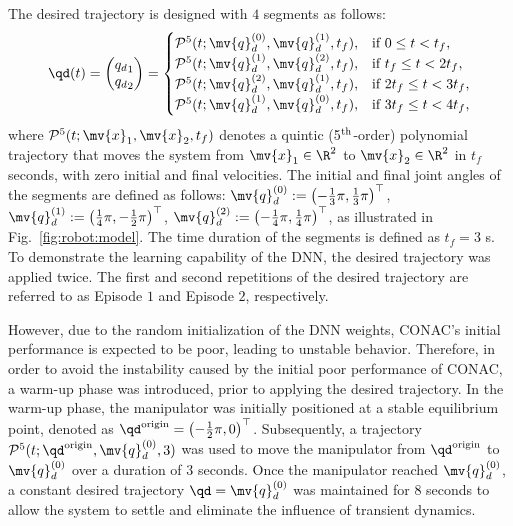 \documentclass[journal]{IEEEtran}
\begin{document}
The desired trajectory is designed with $4$ segments as follows:
\begin{equation}
    \qd(t) 
    =
    \begin{pmatrix}
        {q_d}_1
        \\
        {q_d}_2
    \end{pmatrix}
    =
    \begin{cases}
    \mathcal{P}^5(t;\mv{q}_d^{(0)},\mv{q}_d^{(1)},t_f),
        &
        \text{if } 0 \le t < t_f 
        ,
        \\
    \mathcal{P}^5(t;\mv{q}_d^{(1)},\mv{q}_d^{(2)},t_f),
        &
        \text{if } t_f \le t < 2t_f 
        ,
        \\
    \mathcal{P}^5(t;\mv{q}_d^{(2)},\mv{q}_d^{(1)},t_f),
        & 
        \text{if } 2t_f \le t < 3t_f 
        ,
        \\
    \mathcal{P}^5(t;\mv{q}_d^{(1)},\mv{q}_d^{(0)},t_f),
        &    
        \text{if } 3t_f \le t < 4t_f 
        ,
        \\
    \end{cases} 
    \label{eq:desired trajectory}
\end{equation}
where $\mathcal{P}^5(t;\mv{x}_1,\mv{x}_2,t_f)$ denotes a quintic (5$\textsuperscript{th}$-order) polynomial trajectory that moves the system from $\mv{x}_1\in\R^2$ to $\mv{x}_2\in\R^2$ in $t_f$ seconds, with zero initial and final velocities.
The initial and final joint angles of the segments are defined as follows:
$
    \mv{q}_d^{(0)}:=\left(-\tfrac{1}{3}\pi,\tfrac{1}{3}\pi\right)^\top
$, 
$
    \mv{q}_d^{(1)}:=\left(\tfrac{1}{4}\pi,-\tfrac{1}{2}\pi\right)^\top
$, 
$
    \mv{q}_d^{(2)}:=\left(-\tfrac{1}{4}\pi,\tfrac{1}{4}\pi\right)^\top
$, as illustrated in Fig.~\ref{fig:robot:model}.
The time duration of the segments is defined as $t_f=3$ s.
To demonstrate the learning capability of the DNN, the desired trajectory was applied twice. 
The first and second repetitions of the desired trajectory are referred to as Episode $1$ and Episode $2$, respectively.

However, due to the random initialization of the DNN weights, CONAC's initial performance is expected to be poor, leading to unstable behavior.
Therefore, in order to avoid the instability caused by the initial poor performance of CONAC, a warm-up phase was introduced, prior to applying the desired trajectory.
In the warm-up phase, the manipulator was initially positioned at a stable equilibrium point, denoted as ${\qd}^{\rm{origin}} = \left(-\tfrac{1}{2}\pi, 0\right)^\top$.
Subsequently, a trajectory $\mathcal{P}^5(t; {\qd}^{\rm{origin}}, \mv{q}_d^{(0)},3)$ was used to move the manipulator from ${\qd}^{\rm{origin}}$ to $\mv{q}_d^{(0)}$ over a duration of 3 seconds.
Once the manipulator reached $\mv{q}_d^{(0)}$, a constant desired trajectory $\qd = \mv{q}_d^{(0)}$ was maintained for 8 seconds to allow the system to settle and eliminate the influence of transient dynamics.
\end{document}
